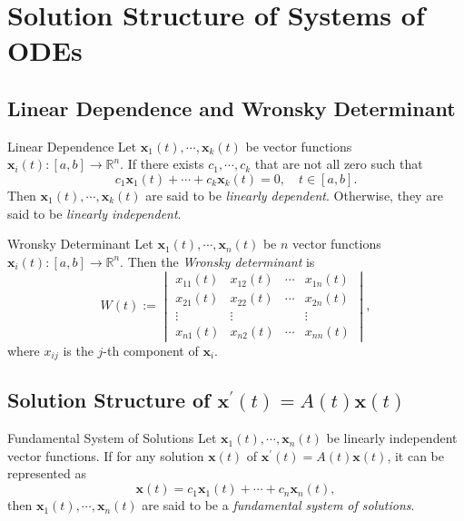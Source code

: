 
\section{Solution Structure of Systems of ODEs}

\subsection{Linear Dependence and Wronsky Determinant}

\begin{definition}{Linear Dependence}{}
  Let $\mathbf{x}_1(t),\cdots, \mathbf{x}_k(t)$ be vector functions $\mathbf{x}_i(t): [a,b] \rightarrow \mathbb{R}^n$.
  If there exists $c_1,\cdots,c_k$ that are not all zero such that
  \begin{equation}
    c_1\mathbf{x}_1(t) + \cdots + c_k\mathbf{x}_k(t) = 0, \quad t \in [a, b].
  \end{equation}
  Then $\mathbf{x}_1(t),\cdots,\mathbf{x}_k(t)$ are said to be \emph{linearly dependent}.
  Otherwise, they are said to be \emph{linearly independent}.
\end{definition}

\begin{definition}{Wronsky Determinant}{}
  Let $\mathbf{x}_1(t),\cdots,\mathbf{x}_n(t)$ be $n$ vector functions $\mathbf{x}_i(t): [a,b] \rightarrow \mathbb{R}^n$.
  Then the \emph{Wronsky determinant} is
  \begin{equation}
    W(t) :=
    \begin{vmatrix}
      x_{11}(t) & x_{12}(t) & \cdots & x_{1n}(t)\\
      x_{21}(t) & x_{22}(t) & \cdots & x_{2n}(t)\\
      \vdots & \vdots & & \vdots\\
      x_{n1}(t) & x_{n2}(t) & \cdots & x_{nn}(t)
    \end{vmatrix},
  \end{equation}
  where $x_{ij}$ is the $j$-th component of $\mathbf{x}_i$.
\end{definition}

\subsection{Solution Structure of $\mathbf{x}^{\prime}(t) = A(t) \mathbf{x}(t)$}

\begin{definition}{Fundamental System of Solutions}{}
  Let $\mathbf{x}_1(t),\cdots,\mathbf{x}_n(t)$ be linearly independent vector functions.
  If for any solution $\mathbf{x}(t)$ of $\mathbf{x}^{\prime}(t) = A(t) \mathbf{x}(t)$,
  it can be represented as
  \begin{equation}
    \mathbf{x}(t) = c_1\mathbf{x}_1(t) + \cdots + c_n\mathbf{x}_n(t),
  \end{equation}
  then $\mathbf{x}_1(t),\cdots,\mathbf{x}_n(t)$ are said to be a \emph{fundamental system of solutions}.
\end{definition}

